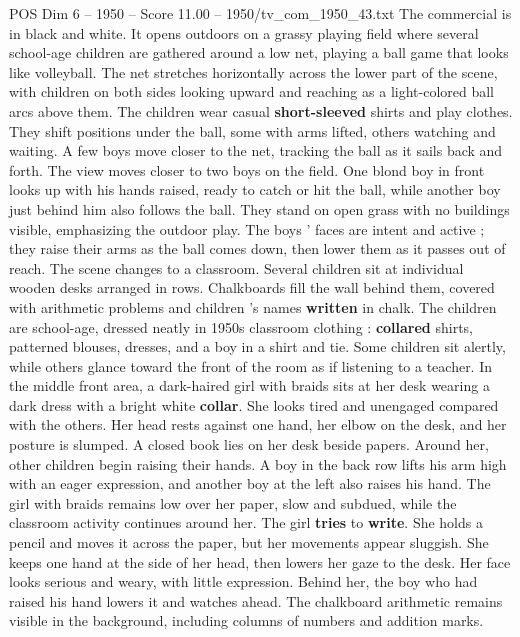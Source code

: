 \begin{textsample}{POS Dim 6 – 1950 – Score 11.00 – 1950/tv\_com\_1950\_43.txt}  \label{ex:f6_pos_017}
The commercial is in black and white.
It opens outdoors on a grassy playing field where several school-age children are gathered around a low net, playing a ball game that looks like volleyball.
The net stretches horizontally across the lower part of the scene, with children on both sides looking upward and reaching as a light-colored ball arcs above them.
The children wear casual \textbf{short-sleeved} shirts and play clothes.
They shift positions under the ball, some with arms lifted, others watching and waiting.
A few boys move closer to the net, tracking the ball as it sails back and forth.
The view moves closer to two boys on the field.
One blond boy in front looks up with his hands raised, ready to catch or hit the ball, while another boy just behind him also follows the ball.
They stand on open grass with no buildings visible, emphasizing the outdoor play.
The boys ’ faces are intent and active ; they raise their arms as the ball comes down, then lower them as it passes out of reach.
The scene changes to a classroom.
Several children sit at individual wooden desks arranged in rows.
Chalkboards fill the wall behind them, covered with arithmetic problems and children ’s names \textbf{written} in chalk.
The children are school-age, dressed neatly in 1950s classroom clothing : \textbf{collared} shirts, patterned blouses, dresses, and a boy in a shirt and tie.
Some children sit alertly, while others glance toward the front of the room as if listening to a teacher.
In the middle front area, a dark-haired girl with braids sits at her desk wearing a dark dress with a bright white \textbf{collar}.
She looks tired and unengaged compared with the others.
Her head rests against one hand, her elbow on the desk, and her posture is slumped.
A closed book lies on her desk beside papers.
Around her, other children begin raising their hands.
A boy in the back row lifts his arm high with an eager expression, and another boy at the left also raises his hand.
The girl with braids remains low over her paper, slow and subdued, while the classroom activity continues around her.
The girl \textbf{tries} to \textbf{write}.
She holds a pencil and moves it across the paper, but her movements appear sluggish.
She keeps one hand at the side of her head, then lowers her gaze to the desk.
Her face looks serious and weary, with little expression.
Behind her, the boy who had raised his hand lowers it and watches ahead.
The chalkboard arithmetic remains visible in the background, including columns of numbers and addition marks.

\end{textsample}
